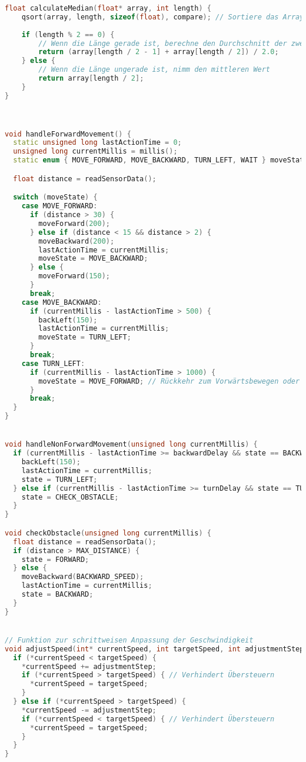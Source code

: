 \documentclass{vorlage-design-main}
\begin{document}
\begin{lstlisting}[language={C++}]
float calculateMedian(float* array, int length) {
    qsort(array, length, sizeof(float), compare); // Sortiere das Array
    
    if (length % 2 == 0) {
        // Wenn die Länge gerade ist, berechne den Durchschnitt der zwei mittleren Werte
        return (array[length / 2 - 1] + array[length / 2]) / 2.0;
    } else {
        // Wenn die Länge ungerade ist, nimm den mittleren Wert
        return array[length / 2];
    }
}



void handleForwardMovement() {
  static unsigned long lastActionTime = 0;
  unsigned long currentMillis = millis();
  static enum { MOVE_FORWARD, MOVE_BACKWARD, TURN_LEFT, WAIT } moveState = MOVE_FORWARD;

  float distance = readSensorData();

  switch (moveState) {
    case MOVE_FORWARD:
      if (distance > 30) {
        moveForward(200);
      } else if (distance < 15 && distance > 2) {
        moveBackward(200);
        lastActionTime = currentMillis;
        moveState = MOVE_BACKWARD;
      } else {
        moveForward(150);
      }
      break;
    case MOVE_BACKWARD:
      if (currentMillis - lastActionTime > 500) {
        backLeft(150);
        lastActionTime = currentMillis;
        moveState = TURN_LEFT;
      }
      break;
    case TURN_LEFT:
      if (currentMillis - lastActionTime > 1000) {
        moveState = MOVE_FORWARD; // Rückkehr zum Vorwärtsbewegen oder zu einem anderen Zustand
      }
      break;
  }
}


void handleNonForwardMovement(unsigned long currentMillis) {
  if (currentMillis - lastActionTime >= backwardDelay && state == BACKWARD) {
    backLeft(150);
    lastActionTime = currentMillis;
    state = TURN_LEFT;
  } else if (currentMillis - lastActionTime >= turnDelay && state == TURN_LEFT) {
    state = CHECK_OBSTACLE;
  }
}

void checkObstacle(unsigned long currentMillis) {
  float distance = readSensorData();
  if (distance > MAX_DISTANCE) {
    state = FORWARD;
  } else {
    moveBackward(BACKWARD_SPEED);
    lastActionTime = currentMillis;
    state = BACKWARD;
  }
}


// Funktion zur schrittweisen Anpassung der Geschwindigkeit
void adjustSpeed(int* currentSpeed, int targetSpeed, int adjustmentStep) {
  if (*currentSpeed < targetSpeed) {
    *currentSpeed += adjustmentStep;
    if (*currentSpeed > targetSpeed) { // Verhindert Übersteuern
      *currentSpeed = targetSpeed;
    }
  } else if (*currentSpeed > targetSpeed) {
    *currentSpeed -= adjustmentStep;
    if (*currentSpeed < targetSpeed) { // Verhindert Übersteuern
      *currentSpeed = targetSpeed;
    }
  }
}


\end{lstlisting}
\end{document}
